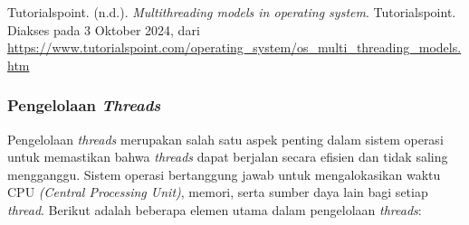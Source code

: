 \documentclass[12pt]{article}
\begin{document}
\begin{enumerate}
\end{enumerate}

\noindent Tutorialspoint. (n.d.). \textit{Multithreading models in operating system}. Tutorialspoint. Diakses pada 3 Oktober 2024, dari \url{https://www.tutorialspoint.com/operating_system/os_multi_threading_models.htm}

\subsubsection{Pengelolaan \textit{Threads}}
Pengelolaan \textit{threads} merupakan salah satu aspek penting dalam sistem operasi untuk memastikan bahwa \textit{threads} dapat berjalan secara efisien dan tidak saling mengganggu. Sistem operasi bertanggung jawab untuk mengalokasikan waktu CPU \textit{(Central Processing Unit)}, memori, serta sumber daya lain bagi setiap \textit{thread}. Berikut adalah beberapa elemen utama dalam pengelolaan \textit{threads}:
\end{document}
